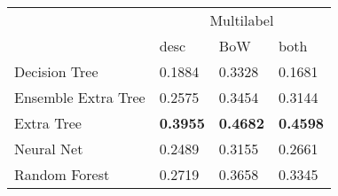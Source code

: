 \begin{tabular}{|l|l|l|l| }
\hline
 &  \multicolumn{3}{c|}{Multilabel} \\
\cline{2-4} & desc & BoW & both \\ \hline
Decision Tree       & 0.1884 & 0.3328 & 0.1681\\
Ensemble Extra Tree & 0.2575 & 0.3454 & 0.3144\\
Extra Tree          & {\bf 0.3955} & {\bf 0.4682} & {\bf 0.4598}\\
Neural Net          & 0.2489 & 0.3155 & 0.2661\\
Random Forest       & 0.2719 & 0.3658 & 0.3345\\
\hline
\end{tabular}